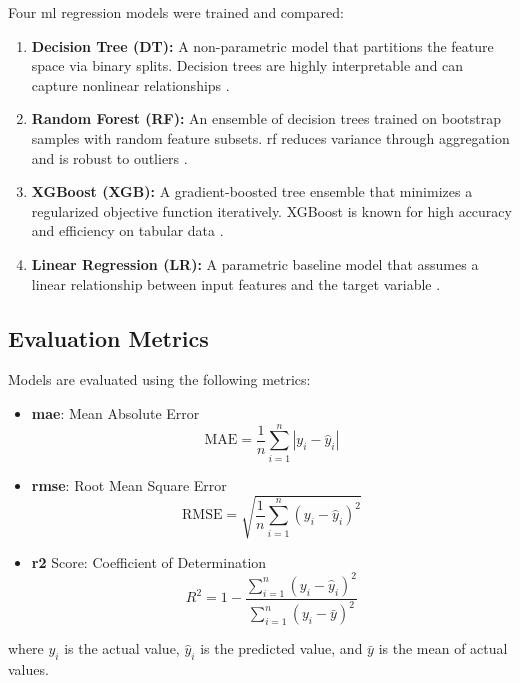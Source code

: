 \documentclass{thesis-library}
\begin{document}
Four \Gls{ml} regression models were trained and compared:

\begin{enumerate}
  \item \textbf{Decision Tree (DT):} A non-parametric model that partitions the feature
        space via binary splits. Decision trees are highly interpretable and can capture
        nonlinear relationships \cite{decision_tree_load2019}.

  \item \textbf{Random Forest (RF):} An ensemble of decision trees trained on bootstrap
        samples with random feature subsets. \Gls{rf} reduces variance through
        aggregation and is robust to outliers \cite{rf_load_forecast2020}.

  \item \textbf{XGBoost (XGB):} A gradient-boosted tree ensemble that minimizes a
        regularized objective function iteratively. XGBoost is known for high accuracy
        and efficiency on tabular data \cite{xgboost_energy2022}.

  \item \textbf{Linear Regression (LR):} A parametric baseline model that assumes a
        linear relationship between input features and the target variable
        \cite{regression_ev2020}.
\end{enumerate}

\subsection{Evaluation Metrics}

Models are evaluated using the following metrics:

\begin{itemize}
  \item \textbf{\Gls{mae}}: Mean Absolute Error
        \[ \text{MAE} = \frac{1}{n}\sum_{i=1}^{n} |y_i - \hat{y}_i| \]

  \item \textbf{\Gls{rmse}}: Root Mean Square Error
        \[ \text{RMSE} = \sqrt{\frac{1}{n}\sum_{i=1}^{n}(y_i - \hat{y}_i)^2} \]

  \item \textbf{\Gls{r2}} Score: Coefficient of Determination
        \[ R^2 = 1 - \frac{\sum_{i=1}^{n}(y_i - \hat{y}_i)^2}{\sum_{i=1}^{n}(y_i - \bar{y})^2} \]
\end{itemize}

where $y_i$ is the actual value, $\hat{y}_i$ is the predicted value, and $\bar{y}$ is
the mean of actual values.
\end{document}
